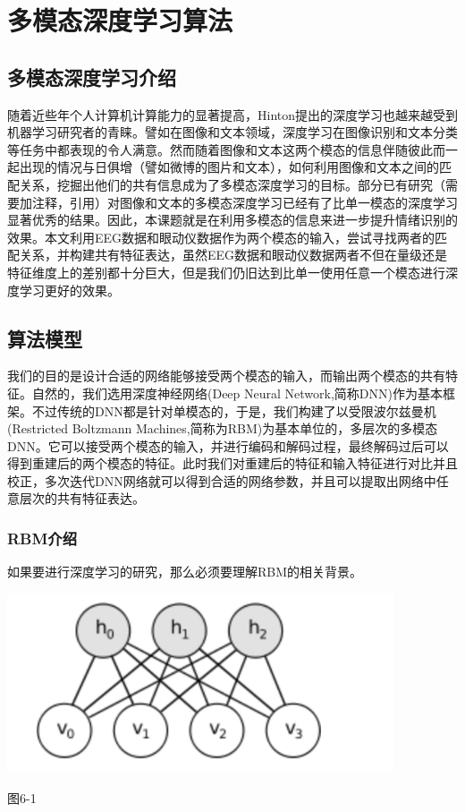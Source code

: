 
\chapter{多模态深度学习算法}
\label{chap:chap6}

\section{多模态深度学习介绍}
	随着近些年个人计算机计算能力的显著提高，Hinton提出的深度学习也越来越受到机器学习研究者的青睐。譬如在图像和文本领域，深度学习在图像识别和文本分类等任务中都表现的令人满意。然而随着图像和文本这两个模态的信息伴随彼此而一起出现的情况与日俱增（譬如微博的图片和文本），如何利用图像和文本之间的匹配关系，挖掘出他们的共有信息成为了多模态深度学习的目标。部分已有研究（需要加注释，引用）对图像和文本的多模态深度学习已经有了比单一模态的深度学习显著优秀的结果。因此，本课题就是在利用多模态的信息来进一步提升情绪识别的效果。本文利用EEG数据和眼动仪数据作为两个模态的输入，尝试寻找两者的匹配关系，并构建共有特征表达，虽然EEG数据和眼动仪数据两者不但在量级还是特征维度上的差别都十分巨大，但是我们仍旧达到比单一使用任意一个模态进行深度学习更好的效果。
	
\section{算法模型}
	我们的目的是设计合适的网络能够接受两个模态的输入，而输出两个模态的共有特征。自然的，我们选用深度神经网络(Deep Neural Network,简称DNN)作为基本框架。不过传统的DNN都是针对单模态的，于是，我们构建了以受限波尔兹曼机(Restricted Boltzmann Machines,简称为RBM)为基本单位的，多层次的多模态DNN。它可以接受两个模态的输入，并进行编码和解码过程，最终解码过后可以得到重建后的两个模态的特征。此时我们对重建后的特征和输入特征进行对比并且校正，多次迭代DNN网络就可以得到合适的网络参数，并且可以提取出网络中任意层次的共有特征表达。
	\subsection{RBM介绍}
	如果要进行深度学习的研究，那么必须要理解RBM的相关背景。\\
	\par
	\centerline{\includegraphics[width=4.5in]{figure/rbm.png}} %
	\centerline{图6-1}

